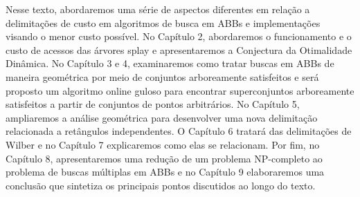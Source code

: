 
Nesse texto, abordaremos uma série de aspectos diferentes em relação a delimitações de custo em algoritmos de busca em ABBs e implementações visando o menor custo possível. No Capítulo 2, abordaremos o funcionamento e o custo de acessos das árvores splay e apresentaremos a Conjectura da Otimalidade Dinâmica. 
No Capítulo 3 e 4, examinaremos como tratar buscas em ABBs de maneira geométrica por meio de conjuntos arboreamente satisfeitos e será proposto um algoritmo online guloso para encontrar superconjuntos arboreamente satisfeitos a partir de conjuntos de pontos arbitrários.
No Capítulo 5, ampliaremos a análise geométrica para desenvolver uma nova delimitação relacionada a retângulos independentes. O Capítulo 6 tratará das delimitações de Wilber e no Capítulo 7 explicaremos como elas se relacionam. Por fim, no Capítulo 8, apresentaremos uma redução de um problema NP-completo ao problema de buscas múltiplas em ABBs e no Capítulo 9 elaboraremos uma conclusão que sintetiza os principais pontos discutidos ao longo do texto.